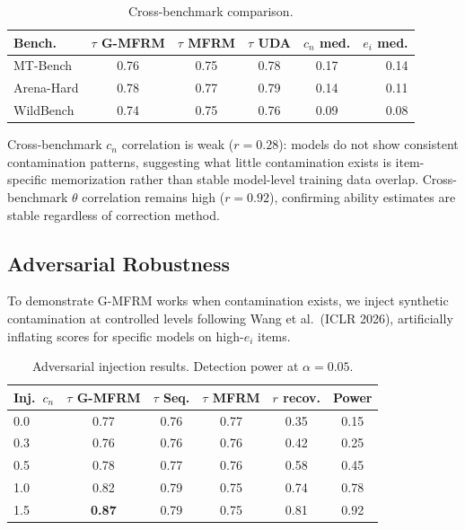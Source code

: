 \documentclass[11pt]{article}
\begin{document}
\begin{table}[t]
\centering
\small
\caption{Cross-benchmark comparison.}
\label{tab:crossbench}
\begin{tabular}{lccccr}
\toprule
\textbf{Bench.} & $\tau$ G-MFRM & $\tau$ MFRM & $\tau$ UDA & $c_n$ med. & $e_i$ med. \\
\midrule
MT-Bench & 0.76 & 0.75 & 0.78 & 0.17 & 0.14 \\
Arena-Hard & 0.78 & 0.77 & 0.79 & 0.14 & 0.11 \\
WildBench & 0.74 & 0.75 & 0.76 & 0.09 & 0.08 \\
\bottomrule
\end{tabular}
\end{table}

Cross-benchmark $c_n$ correlation is weak ($r = 0.28$): models do not show consistent contamination patterns, suggesting what little contamination exists is item-specific memorization rather than stable model-level training data overlap.
Cross-benchmark $\theta$ correlation remains high ($r = 0.92$), confirming ability estimates are stable regardless of correction method.

\subsection{Adversarial Robustness}
\label{sec:adversarial}

To demonstrate G-MFRM works when contamination exists, we inject synthetic contamination at controlled levels following Wang et al.~(ICLR 2026), artificially inflating scores for specific models on high-$e_i$ items.

\begin{table}[t]
\centering
\small
\caption{Adversarial injection results. Detection power at $\alpha = 0.05$.}
\label{tab:adversarial}
\begin{tabular}{lccccc}
\toprule
\textbf{Inj.\ $c_n$} & $\tau$ G-MFRM & $\tau$ Seq. & $\tau$ MFRM & $r$ recov. & Power \\
\midrule
0.0 & 0.77 & 0.76 & 0.77 & 0.35 & 0.15 \\
0.3 & 0.76 & 0.76 & 0.76 & 0.42 & 0.25 \\
0.5 & 0.78 & 0.77 & 0.76 & 0.58 & 0.45 \\
1.0 & 0.82 & 0.79 & 0.75 & 0.74 & 0.78 \\
1.5 & \textbf{0.87} & 0.79 & 0.75 & 0.81 & 0.92 \\
\bottomrule
\end{tabular}
\end{table}
\end{document}

